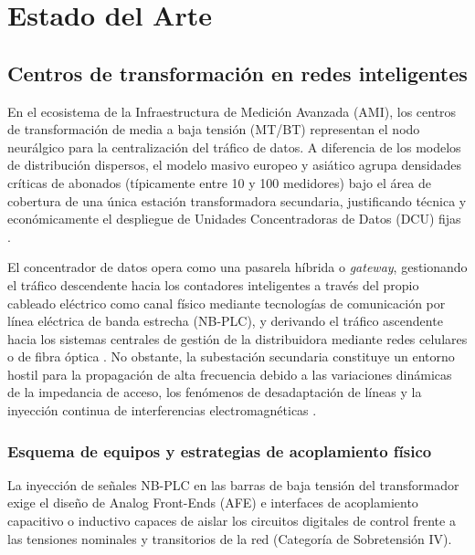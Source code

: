\chapter{Estado del Arte}
\label{ch:state_of_the_art}

\section{Centros de transformación en redes inteligentes}
\label{sec:centros_transformacion}

En el ecosistema de la Infraestructura de Medición Avanzada (AMI), los centros de transformación de media a baja tensión (MT/BT) representan el nodo neurálgico para la centralización del tráfico de datos. A diferencia de los modelos de distribución dispersos, el modelo masivo europeo y asiático agrupa densidades críticas de abonados (típicamente entre 10 y 100 medidores) bajo el área de cobertura de una única estación transformadora secundaria, justificando técnica y económicamente el despliegue de Unidades Concentradoras de Datos (DCU) fijas \cite{6925952}. 

El concentrador de datos opera como una pasarela híbrida o \textit{gateway}, gestionando el tráfico descendente hacia los contadores inteligentes a través del propio cableado eléctrico como canal físico mediante tecnologías de comunicación por línea eléctrica de banda estrecha (NB-PLC), y derivando el tráfico ascendente hacia los sistemas centrales de gestión de la distribuidora mediante redes celulares o de fibra óptica \cite{SHARMA2017704, 10843716}. No obstante, la subestación secundaria constituye un entorno hostil para la propagación de alta frecuencia debido a las variaciones dinámicas de la impedancia de acceso, los fenómenos de desadaptación de líneas y la inyección continua de interferencias electromagnéticas \cite{9115397, 9881962}.

\subsection{Esquema de equipos y estrategias de acoplamiento físico}
\label{subsec:acoplamiento_PLC}

La inyección de señales NB-PLC en las barras de baja tensión del transformador exige el diseño de Analog Front-Ends (AFE) e interfaces de acoplamiento capacitivo o inductivo capaces de aislar los circuitos digitales de control frente a las tensiones nominales y transitorios de la red (Categoría de Sobretensión IV). 

